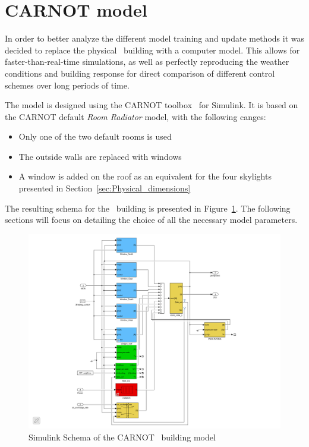 \section{CARNOT model}\label{sec:CARNOT}

In order to better analyze the different model training and update methods it
was decided to replace the physical \pdome\ building with a computer model.
This allows for faster-than-real-time simulations, as well as perfectly
reproducing the weather conditions and building response for direct comparison
of different control schemes over long periods of time.

The model is designed using the CARNOT
toolbox~\cite{lohmannEinfuehrungSoftwareMATLAB} for Simulink. It is based on the
CARNOT default \textit{Room Radiator} model, with the following canges:
\begin{itemize}
    \item Only one of the two default rooms is used
    \item The outside walls are replaced with windows
    \item A window is added on the roof as an equivalent for the four skylights
        presented in Section~\ref{sec:Physical_dimensions}
\end{itemize}

The resulting schema for the \pdome\ building is presented in
Figure~\ref{fig:CARNOT_polydome}. The following sections will focus on detailing
the choice of all the necessary model parameters.

\begin{figure}[ht]
    \centering
    \includegraphics[width = \textwidth]{Images/polydome_room_model.pdf}
    \caption{Simulink Schema of the CARNOT \pdome\ building model}
    \label{fig:CARNOT_polydome}
\end{figure}

